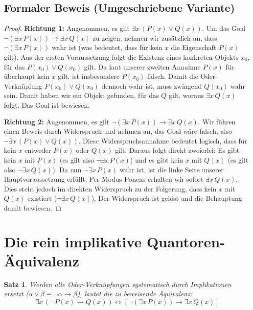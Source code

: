 \documentclass{article}
\newtheorem{theorem}{Satz}
\begin{document}
\subsection*{Formaler Beweis (Umgeschriebene Variante)}
\begin{proof}
\textbf{Richtung 1:} Angenommen, es gilt $\exists x \, (P(x) \lor Q(x))$. Um das Goal $\neg(\exists x \, P(x)) \rightarrow \exists x \, Q(x)$ zu zeigen, nehmen wir zusätzlich an, dass $\neg(\exists x \, P(x))$ wahr ist (was bedeutet, dass für kein $x$ die Eigenschaft $P(x)$ gilt).
Aus der ersten Voraussetzung folgt die Existenz eines konkreten Objekts $x_0$, für das $P(x_0) \lor Q(x_0)$ gilt. Da laut unserer zweiten Annahme $P(x)$ für überhaupt kein $x$ gilt, ist insbesondere $P(x_0)$ falsch. Damit die Oder-Verknüpfung $P(x_0) \lor Q(x_0)$ dennoch wahr ist, muss zwingend $Q(x_0)$ wahr sein. Damit haben wir ein Objekt gefunden, für das $Q$ gilt, woraus $\exists x \, Q(x)$ folgt. Das Goal ist bewiesen.

\medskip
\textbf{Richtung 2:} Angenommen, es gilt $\neg(\exists x \, P(x)) \rightarrow \exists x \, Q(x)$. Wir führen einen Beweis durch Widerspruch und nehmen an, das Goal wäre falsch, also $\neg\exists x \, (P(x) \lor Q(x))$.
Diese Widerspruchsannahme bedeutet logisch, dass für kein $x$ entweder $P(x)$ oder $Q(x)$ gilt. Daraus folgt direkt zweierlei: Es gibt kein $x$ mit $P(x)$ (es gilt also $\neg\exists x \, P(x)$) und es gibt kein $x$ mit $Q(x)$ (es gilt also $\neg\exists x \, Q(x)$).
Da nun $\neg\exists x \, P(x)$ wahr ist, ist die linke Seite unserer Hauptvoraussetzung erfüllt. Per Modus Ponens erhalten wir sofort $\exists x \, Q(x)$. Dies steht jedoch im direkten Widerspruch zu der Folgerung, dass kein $x$ mit $Q(x)$ existiert ($\neg\exists x \, Q(x)$). Der Widerspruch ist gelöst und die Behauptung damit bewiesen.
\end{proof}

\newpage

\section*{Die rein implikative Quantoren-Äquivalenz}

\begin{theorem}
Werden alle Oder-Verknüpfungen systematisch durch Implikationen ersetzt ($\alpha \lor \beta \equiv \neg \alpha \rightarrow \beta$), lautet die zu beweisende Äquivalenz:
\[ \exists x \, (\neg P(x) \rightarrow Q(x)) \iff \left[ \neg(\exists x \, P(x)) \rightarrow \exists x \, Q(x) \right] \]
\end{theorem}
\end{document}

